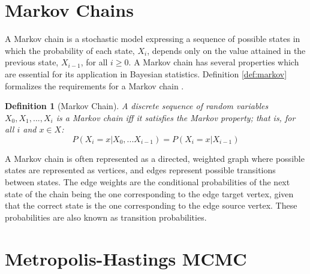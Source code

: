 \documentclass[
  12pt,
]{book}
\theoremstyle{definition}
\newtheorem{definition}{Definition}[chapter]
\theoremstyle{definition}
\theoremstyle{definition}
\theoremstyle{remark}
\begin{document}
\hypertarget{markov-chains}{%
\section{Markov Chains}\label{markov-chains}}

A Markov chain is a stochastic model expressing a sequence of possible states in which the probability of each state, \(X_{i}\), depends only on the value attained in the previous state, \(X_{i-1}\), for all \(i \geq 0\).
A Markov chain has several properties which are essential for its application in Bayesian statistics.
Definition \ref{def:markov} formalizes the requirements for a Markov chain \citep{Wasserman2004}.

\begin{definition}[Markov Chain]
\protect\hypertarget{def:markov}{}{\label{def:markov} {} }\emph{A discrete sequence of random variables \({X_{0},X_{1},...,X_{i}}\) is a Markov chain iff it satisfies the Markov property; that is, for all \(i\) and \(x \in X\):}
\[P(X_{i}=x|X_{0},...X_{i-1})=P(X_{i}=x|X_{i-1})\]
\end{definition}

A Markov chain is often represented as a directed, weighted graph where possible states are represented as vertices, and edges represent possible transitions between states. The edge weights are the conditional probabilities of the next state of the chain being the one corresponding to the edge target vertex, given that the correct state is the one corresponding to the edge source vertex. These probabilities are also known as transition probabilities.

\hypertarget{metropolis-hastings-mcmc}{%
\section{Metropolis-Hastings MCMC}\label{metropolis-hastings-mcmc}}
\end{document}

